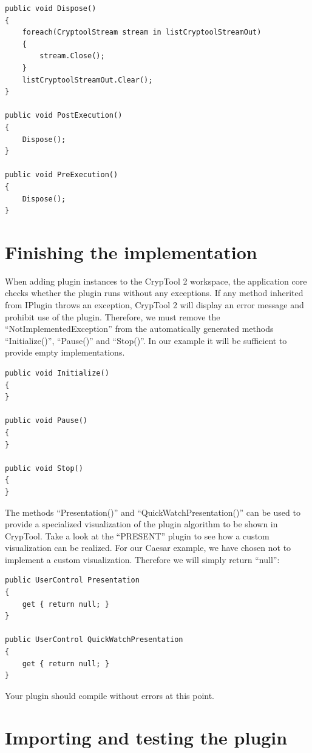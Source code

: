 \begin{lstlisting}
public void Dispose()
{
	foreach(CryptoolStream stream in listCryptoolStreamOut)
	{
		stream.Close();
	}
	listCryptoolStreamOut.Clear();
}

public void PostExecution()
{
	Dispose();
}

public void PreExecution()
{
	Dispose();
}
\end{lstlisting}
\clearpage

\section{Finishing the implementation}
\label{sec:FinishingTheImplementation}

When adding plugin instances to the CrypTool 2 workspace, the application core checks whether the plugin runs without any exceptions. If any method inherited from IPlugin throws an exception, CrypTool 2 will display an error message and prohibit use of the plugin. Therefore, we must remove the ``NotImplementedException'' from the automatically generated methods ``Initialize()'', ``Pause()'' and ``Stop()''. In our example it will be sufficient to provide empty implementations.

\begin{lstlisting}
public void Initialize()
{
}

public void Pause()
{
}

public void Stop()
{
}
\end{lstlisting}

The methods ``Presentation()'' and ``QuickWatchPresentation()'' can be used to provide a specialized visualization of the plugin algorithm to be shown in CrypTool. Take a look at the ``PRESENT'' plugin to see how a custom visualization can be realized. For our Caesar example, we have chosen not to implement a custom visualization. Therefore we will simply return ``null'':

\begin{lstlisting}
public UserControl Presentation
{
	get { return null; }
}

public UserControl QuickWatchPresentation
{
	get { return null; }
}
\end{lstlisting}

Your plugin should compile without errors at this point.
\clearpage

\section{Importing and testing the plugin}
\label{sec:ImportingAndTestingThePlugin}

